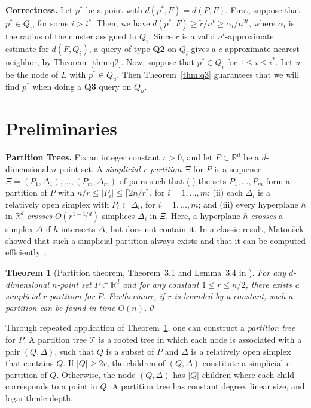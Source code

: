 \documentclass[a4paper,11pt]{paper}
\newcommand{\mathset}[1]{\ensuremath {\mathbb {#1}}}
\newcommand{\R}{\mathset{R}}
\newtheorem{theorem} {Theorem}[section]
\begin{document}
\noindent
\textbf{Correctness.}
Let $p^*$ be a point with $d(p^*, F) = d(P,F)$.
First, suppose that $p^* \in Q_i$,
for some $i > i^*$. Then, we have
$d(p^*,F) \geq \widetilde{r}/n^t \geq \alpha_i/n^{2t}$, where $\alpha_i$
is the radius of the cluster assigned to $Q_i$.
Since $\widetilde{r}$ is a valid $n^t$-approximate
estimate for $d(F, Q_i)$,
a query of type \textbf{Q2} on $Q_i$ gives a $c$-approximate nearest
neighbor, by Theorem~\ref{thm:q2}.
Now, suppose that $p^* \in Q_i$ for $1 \leq i \leq i^*$.
Let $u$ be the node of $L$
with $p^* \in Q_u$. Then Theorem~\ref{thm:q3} guarantees
that we will find
$p^*$ when doing a \textbf{Q3} query on $Q_u$.

\section{Preliminaries}
\label{sec:preliminaries}

\noindent
\textbf{Partition Trees.}
Fix an integer constant $r > 0$, and
let $P \subset \R^d$ be a $d$-dimensional $n$-point set.
A \emph{simplicial $r$-partition} $\Xi$ for $P$ is a sequence
$\Xi = (P_1, \Delta_1), \dots, (P_m, \Delta_m)$ of pairs
such that (i) the sets $P_1, \dots, P_m$ form a partition of
$P$ with $n/r \leq |P_i| \leq \lceil 2n/r \rceil$, for
$i = 1, \dots, m$;
(ii) each $\Delta_i$ is a relatively open simplex with
$P_i \subset \Delta_i$, for $i = 1, \dots, m$; and
(iii) every hyperplane $h$ in $\R^d$ \emph{crosses} $O(r^{1-1/d})$
  simplices $\Delta_i$ in $\Xi$. Here, a hyperplane $h$ \emph{crosses}
  a simplex $\Delta$ if $h$ intersects $\Delta$, but does not
  contain it.
In a classic result, Matou\v{s}ek showed that such a simplicial
partition always exists and that it can be computed
efficiently~\cite{Matousek92,Chazelle00}.

\begin{theorem}[Partition theorem, Theorem~3.1 and Lemma~3.4
  in \cite{Matousek92}]\label{thm:partition}
  For any $d$-dimensional $n$-point set $P \subset \R^d$ and for
  any constant $1 \leq r \leq n/2$, there exists a simplicial
  $r$-partition for $P$. Furthermore, if $r$ is bounded by
  a constant, such a partition can be found in time $O(n)$.\qed
\end{theorem}

Through repeated application of Theorem~\ref{thm:partition},
one can construct a \emph{partition tree} for $P$.
A partition tree $\mathcal{T}$ is a rooted tree in which each node
is associated with a pair $(Q, \Delta)$, such that $Q$ is a subset
of $P$ and $\Delta$ is a relatively open simplex that
contains $Q$. If $|Q| \geq 2r$, the children of $(Q, \Delta)$
constitute a simplicial $r$-partition of $Q$. Otherwise,
the node $(Q, \Delta)$ has $|Q|$ children where each child
corresponds to a point in $Q$. A partition tree has
constant degree, linear size, and logarithmic depth.
\end{document}
